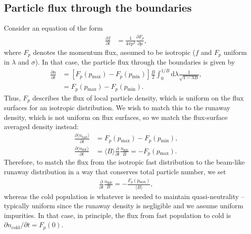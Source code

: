 \documentclass[11pt,a4paper]{article}
\newcommand{\rd}{\ensuremath{\mathrm{d}}}
\newcommand{\sub}[1]{\ensuremath{_{\text{#1}}}}
\begin{document}
\subsection{Particle flux through the boundaries}
Consider an equation of the form
\begin{align}
\frac{\partial f}{\partial t} &= \frac{1}{4\pi p^2}\frac{\partial F_p}{\partial p},
\end{align}
where $F_p$ denotes the momentum flux, assumed to be isotropic ($f$ and $F_p$ uniform in $\lambda$ and $\sigma$). In that case, the particle flux through the boundaries is given by
\begin{align}
\frac{\partial n}{\partial t} &=[F_p(p\sub{max}) - F_p(p\sub{min})]\frac{B}{2} \int_0^{1/B} \rd \lambda \frac{1}{\sqrt{1-\lambda B}}, \nonumber \\
&=F_p(p\sub{max}) - F_p(p\sub{min}).
\end{align}
Thus, $F_p$ describes the flux of local particle density, which is uniform on the flux surfaces for an isotropic distribution. We wish to match this to the runaway density, which is not uniform on flux surfaces, so we match the flux-surface averaged density instead:
\begin{align}
\frac{\partial \langle n\sub{fast} \rangle}{\partial t} &= F_p(p\sub{max}) - F_p(p\sub{min}), \nonumber \\
\frac{\partial \langle n\sub{RE} \rangle}{\partial t} &= \langle B \rangle \frac{\partial}{\partial t}\frac{n\sub{RE}}{B} = - F_p(p\sub{max}) .
\end{align}
Therefore, to match the flux from the isotropic fast distribution to the beam-like runaway distribution in a way that conserves total particle number, we set
\begin{align}
\frac{\partial}{\partial t}\frac{n\sub{RE}}{B} =  - \frac{F_p(p\sub{max})}{\langle B\rangle} ,
\end{align}
whereas the cold population is whatever is needed to maintain quasi-neutrality -- typically uniform since the runaway density is negligible and we assume uniform impurities. In that case, in principle, the flux from fast population to cold is $\partial n\sub{cold}/\partial t = F_p(0)$.
\end{document}
